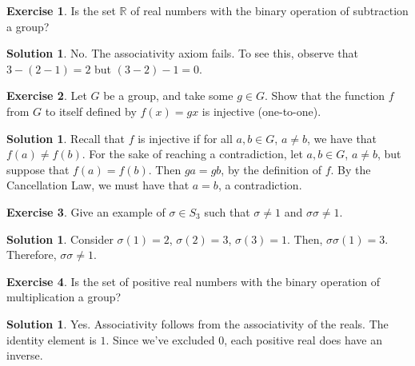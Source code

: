 \documentclass[12pt]{article}
\theoremstyle{definition}
\newtheorem{exercise}{Exercise}
\theoremstyle{definition}
\newtheorem{solution}[theorem]{Solution}
\begin{document}
\begin{exercise}
Is the set $\mathbb{R}$ of real numbers with the binary operation of subtraction a group?
\end{exercise}
\begin{solution}
No. The associativity axiom fails. To see this, observe that $3 - (2 - 1) = 2$ but $(3 - 2) - 1 = 0$. 
\end{solution}

\begin{exercise}
Let $G$ be a group, and take some $g \in G$. Show that the function $f$ from $G$ to itself defined by $f(x)=gx$ is injective (one-to-one).
\end{exercise} 
\begin{solution}
Recall that $f$ is injective if for all $a, b \in G$, $a \neq b$, we have that $f(a) \neq f(b)$. For the sake of reaching a contradiction, let $a,b \in G$, $a \neq b$, but suppose that $f(a) = f(b)$. Then $ga = gb$, by the definition of $f$. By the Cancellation Law, we must have that $a = b$, a contradiction.
\end{solution}

\begin{exercise}
Give an example of $\sigma \in S_3$ such that $\sigma \neq 1$ and $\sigma \sigma \neq 1$.
\end{exercise}
\begin{solution}
Consider $\sigma(1) = 2$, $\sigma(2) = 3$, $\sigma(3) = 1$. Then, $\sigma \sigma(1)=3$. Therefore, $\sigma\sigma \neq 1$.
\end{solution}

\begin{exercise}
Is the set of positive real numbers with the binary operation of multiplication a group?
\end{exercise}
\begin{solution}
Yes. Associativity follows from the associativity of the reals. The identity element is $1$. Since we've excluded $0$, each positive real does have an inverse.
\end{solution}
\end{document}
